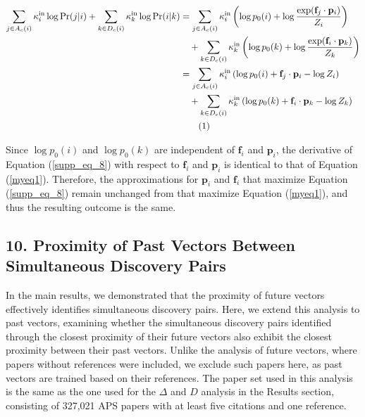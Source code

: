 \documentclass[12pt]{article}
\begin{document}
\begin{refsection}
\begin{align*}
  \sum_{j \in A_c(i)} \kappa_i^{\text{in}} \log \text{Pr}(j | i) + 
  \sum_{k \in D_c(i)} \kappa_{k}^{\text{in}} \log \text{Pr}(i | k)  
  &= \sum_{j \in A_c(i)} \kappa_i^{\text{in}} \left( \log p_0(i) + \log \frac{\exp({\mathbf{f}_j \cdot \mathbf{p}_i})}{Z_i} \right) \\
  &\quad + \sum_{k \in D_c(i)} \kappa_{k}^{\text{in}} \left( \log p_0(k) + \log \frac{\exp({\mathbf{f}_i \cdot \mathbf{p}_k})}{Z_k} \right) \\
  &= \sum_{j \in A_c(i)} \kappa_i^{\text{in}} \left( \log p_0(i) + \mathbf{f}_j \cdot \mathbf{p}_i - \log Z_i \right) \\
  &\quad + \sum_{k \in D_c(i)} \kappa_{k}^{\text{in}} \left( \log p_0(k) + \mathbf{f}_i \cdot \mathbf{p}_k - \log Z_k \right) \\
  & \stepcounter{equation} \tag{\theequation} \label{supp_eq_8}
\end{align*}

Since $\log p_0(i)$ and $\log p_0(k)$ are independent of $\mathbf{f}_i$ and $\mathbf{p}_i$, the derivative of Equation (\ref{supp_eq_8}) with respect to $\mathbf{f}_i$ and  $\mathbf{p}_i$ is identical to that of Equation (\ref{myeq1}). Therefore, the approximations for $\mathbf{p}_i$ and $\mathbf{f}_i$ that maximize Equation (\ref{supp_eq_8}) remain unchanged from that maximize Equation (\ref{myeq1}), and thus the resulting outcome is the same.



\subsection*{10. Proximity of Past Vectors Between Simultaneous Discovery Pairs}

In the main results, we demonstrated that the proximity of future vectors effectively identifies simultaneous discovery pairs. Here, we extend this analysis to past vectors, examining whether the simultaneous discovery pairs identified through the closest proximity of their future vectors also exhibit the closest proximity between their past vectors. Unlike the analysis of future vectors, where papers without references were included, we exclude such papers here, as past vectors are trained based on their references. The paper set used in this analysis is the same as the one used for the $\Delta$ and $D$ analysis in the Results section, consisting of 327,021 APS papers with at least five citations and one reference.


\end{refsection}
\end{document}
